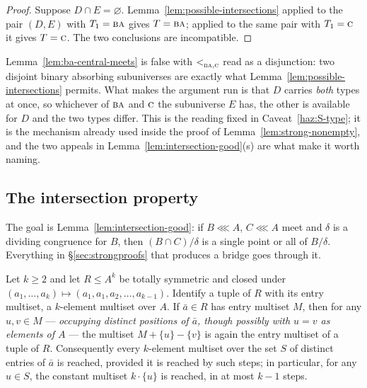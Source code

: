 \begin{proof}
Suppose $D\cap E=\varnothing$. Lemma~\ref{lem:possible-intersections} applied
to the pair $(D,E)$ with $T_{1}=\textup{\textsc{ba}}$ gives $T=\textup{\textsc{ba}}$; applied to the same pair
with $T_{1}=\textup{\textsc{c}}$ it gives $T=\textup{\textsc{c}}$. The two conclusions are incompatible.
\end{proof}

\begin{hazard}\label{haz:ba-central-meets}
Lemma~\ref{lem:ba-central-meets} is false with $<_{\textup{\textsc{ba}},\textup{\textsc{c}}}^{}$ read as a
disjunction: two disjoint binary absorbing subuniverses are exactly what
Lemma~\ref{lem:possible-intersections} permits. What makes the argument run is
that $D$ carries \emph{both} types at once, so whichever of $\textup{\textsc{ba}}$ and $\textup{\textsc{c}}$
the subuniverse $E$ has, the other is available for $D$ and the two types
differ. This is the reading fixed in Caveat~\ref{haz:S-type}; it is the
mechanism already used inside the proof of Lemma~\ref{lem:strong-nonempty},
and the two appeals in Lemma~\ref{lem:intersection-good}(s) are what make it
worth naming.
\end{hazard}

\subsection{The intersection property}\label{sec:intersection-property}

The goal is Lemma~\ref{lem:intersection-good}: if $B\lll A$, $C\lll A$ meet and
$\delta$ is a dividing congruence for $B$, then $(B\cap C)/\delta$ is a single
point or all of $B/\delta$. Everything in \S\ref{sec:strongproofs} that
produces a bridge goes through it.

\begin{lemma}\label{lem:multiset-shift}
Let $k\ge2$ and let $R\le A^{k}$ be totally symmetric and closed under
$(a_{1},\dots,a_{k})\mapsto(a_{1},a_{1},a_{2},\dots,a_{k-1})$. Identify a tuple
of $R$ with its entry multiset, a $k$-element multiset over $A$. If
$\bar a\in R$ has entry multiset $M$, then for any $u,v\in M$ ---
\emph{occupying distinct positions of $\bar a$, though possibly with $u=v$ as
elements of $A$} --- the multiset $M+\{u\}-\{v\}$ is again the entry multiset of
a tuple of $R$. Consequently every $k$-element multiset over the set $S$ of
distinct entries of $\bar a$ is reached, provided it is reached by such steps;
in particular, for any $u\in S$, the constant multiset $k\cdot\{u\}$ is
reached, in at most $k-1$ steps.
\end{lemma}

